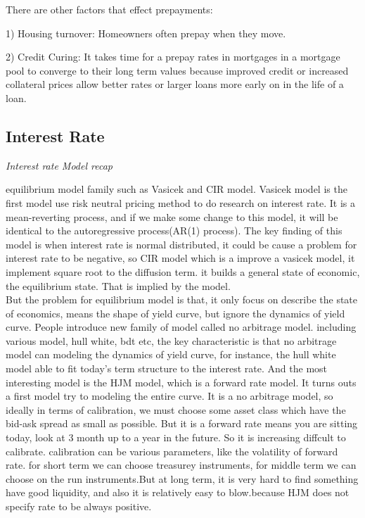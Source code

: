 \documentclass[a4paper,11pt]{article}
\begin{document}
There are other factors that effect prepayments:

1) Housing turnover: Homeowners often prepay when they move.

2) Credit Curing: It takes time for a prepay rates in mortgages in a
mortgage pool to converge to their long term values because improved
credit or increased collateral prices allow better rates or larger
loans more early on in the life of a loan.\\
\subsection{Interest Rate}
\begin{centering}
\em {Interest rate Model recap\\}
\end{centering}
equilibrium model family such as Vasicek and CIR model. Vasicek model is the first model use risk neutral pricing method to do research on interest rate. It is a mean-reverting process, and if we make some change to this model, it will be identical to the autoregressive process(AR(1) process). The key finding of this model is when interest rate is normal distributed, it could be cause a problem for interest rate to be negative, so CIR model which is a improve a vasicek model, it implement square root to the diffusion term. it builds a general state of economic, the equilibrium  state. That is implied by the model.\\
But the problem for equilibrium  model is that, it only focus on describe the state of economics, means the shape of yield curve, but ignore the dynamics of yield curve. People introduce new family of model called no arbitrage model.
including various model, hull white, bdt etc, the key characteristic is that no arbitrage model can modeling the dynamics of yield curve, for instance, the hull white model able to fit today's term structure to the interest rate. And the most interesting model is the HJM model, which is a forward rate model. It turns outs a first model try to modeling the entire curve. It is a no arbitrage model, so ideally in terms of calibration, we must choose some asset class which have the bid-ask spread as small as possible. But it is a forward rate means you are sitting today, look at 3 month up to a year in the future. So it is increasing diffcult to calibrate. calibration can be various parameters, like the volatility of forward rate. for short term we can choose treasurey instruments, for middle term
we can choose on the run instruments.But at long term, it is very hard to find something have good liquidity, and also it is relatively easy to blow.because HJM does not specify rate to be always positive.\\
\end{document}
